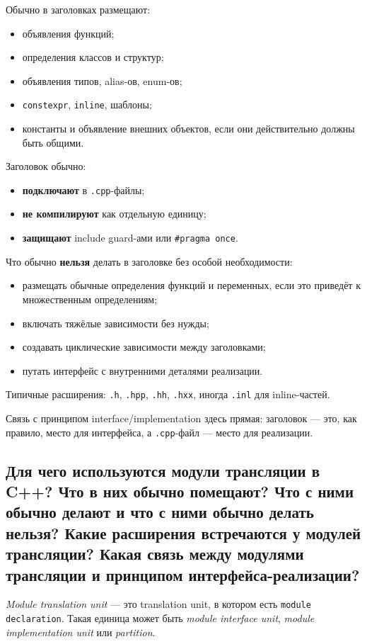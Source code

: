 Обычно в заголовках размещают:
\begin{itemize}
    \item объявления функций;
    \item определения классов и структур;
    \item объявления типов, alias-ов, enum-ов;
    \item \texttt{constexpr}, \texttt{inline}, шаблоны;
    \item константы и объявление внешних объектов, если они действительно должны быть общими.
\end{itemize}

Заголовок обычно:
\begin{itemize}
    \item \textbf{подключают} в \texttt{.cpp}-файлы;
    \item \textbf{не компилируют} как отдельную единицу;
    \item \textbf{защищают} include guard-ами или \texttt{\#pragma once}.
\end{itemize}

Что обычно \textbf{нельзя} делать в заголовке без особой необходимости:
\begin{itemize}
    \item размещать обычные определения функций и переменных, если это приведёт к множественным определениям;
    \item включать тяжёлые зависимости без нужды;
    \item создавать циклические зависимости между заголовками;
    \item путать интерфейс с внутренними деталями реализации.
\end{itemize}

Типичные расширения: \texttt{.h}, \texttt{.hpp}, \texttt{.hh}, \texttt{.hxx}, иногда \texttt{.inl} для inline-частей.

\begin{remark}
Связь с принципом interface/implementation здесь прямая: заголовок — это, как правило, место для интерфейса, а \texttt{.cpp}-файл — место для реализации.
\end{remark}

\subsection{Для чего используются модули трансляции в C++? Что в них обычно помещают? Что с ними обычно делают и что с ними обычно делать нельзя? Какие расширения встречаются у модулей трансляции? Какая связь между модулями трансляции и принципом интерфейса-реализации?}
\begin{definition}
\textit{Module translation unit} — это translation unit, в котором есть \texttt{module declaration}. Такая единица может быть \textit{module interface unit}, \textit{module implementation unit} или \textit{partition}.
\end{definition}

